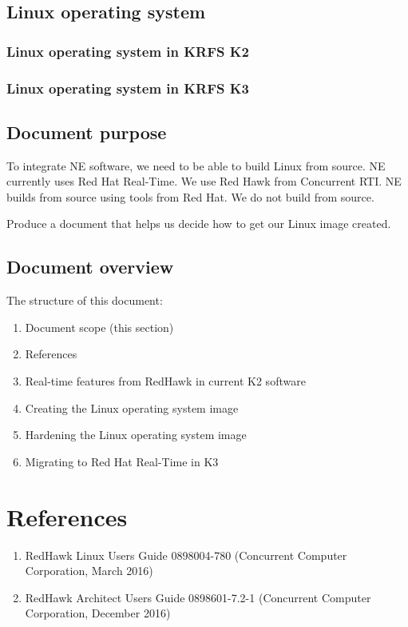 \documentclass[12pt]{article}
\begin{document}
\subsection{Linux operating system}

\subsubsection{Linux operating system in KRFS K2}

\subsubsection{Linux operating system in KRFS K3}


\subsection{Document purpose}
To integrate NE software, we need to be able to build Linux from source.  NE currently uses Red Hat Real-Time.  We use Red Hawk from Concurrent RTI.  NE builds from source using tools from Red Hat.  We do not build from source.

Produce a document that helps us decide how to get our Linux image created.


\subsection{Document overview}
The structure of this document:

\begin{enumerate}
    \item Document scope (this section)
    \item References
    \item Real-time features from RedHawk in current K2 software
    \item Creating the Linux operating system image
    \item Hardening the Linux operating system image
    \item Migrating to Red Hat Real-Time in K3
\end{enumerate}



%
\section{References}

\begin{enumerate}
    \item RedHawk Linux Users Guide 0898004-780 (Concurrent Computer Corporation, March 2016) \label{ref:red_hawk_guide}
    \item RedHawk Architect Users Guide  0898601-7.2-1 (Concurrent Computer Corporation, December 2016) \label{ref:architect}
\end{enumerate}
\end{document}
